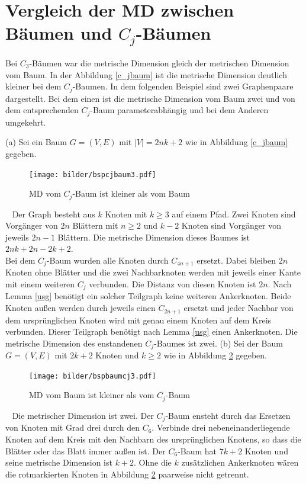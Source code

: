 \section{Vergleich der MD zwischen Bäumen und $C_j$-Bäumen}
Bei $C_3$-Bäumen war die metrische Dimension gleich der metrischen Dimension vom Baum. In der Abbildung \ref{c_jbaum} ist die metrische Dimension deutlich kleiner bei dem $C_j$-Baumen. In dem folgenden Beispiel sind zwei Graphenpaare dargestellt. Bei dem einen ist die metrische Dimension vom Baum zwei und von dem entsprechenden $C_j$-Baum parameterabhängig und bei dem Anderen umgekehrt.\\
\begin{bsp} (a) Sei ein Baum $G=(V,E)$ mit $|V|=2nk+2$ wie in Abbildung \ref{c_jbaum} gegeben.

\begin{figure}[ht]
\centering
\texttt{[image: bilder/bspcjbaum3.pdf]}
\caption{MD vom $C_j$-Baum ist kleiner als vom Baum}
\label{cjbaum}
\end{figure}
\vspace{-5mm}
~\linebreak
Der Graph besteht aus $k$ Knoten mit $k\geq 3$ auf einem Pfad. Zwei Knoten sind Vorgänger von $2n$ Blättern mit $n\geq 2$ und $k-2$ Knoten sind Vorgänger von jeweils $2n-1$ Blättern. Die metrische Dimension dieses Baumes ist $2nk+2n-2k+2$.\\
Bei dem $C_j$-Baum wurden alle Knoten durch $C_{4n+1}$ ersetzt. Dabei bleiben $2n$ Knoten ohne Blätter und die zwei Nachbarknoten werden mit jeweils einer Kante mit einem weiteren $C_j$ verbunden. Die Distanz von diesen Knoten ist $2n$. Nach Lemma \ref{usg} benötigt ein solcher Teilgraph keine weiteren Ankerknoten. Beide Knoten außen werden durch jeweils einen $C_{2n+1}$ ersetzt und jeder Nachbar von dem ursprünglichen Knoten wird mit genau einem Knoten auf dem Kreis verbunden. Dieser Teilgraph benötigt nach Lemma \ref{usg} einen Ankerknoten. Die metrische Dimension des enstandenen $C_j$-Baumes ist zwei.\newline\newline
(b) Sei der Baum $G=(V,E)$ mit $2k+2$ Knoten und $k\geq 2$ wie in Abbildung \ref{baumcj} gegeben.
\begin{figure}[ht]
\centering
\texttt{[image: bilder/bspbaumcj3.pdf]}
\caption{MD vom Baum ist kleiner als vom $C_j$-Baum}
\label{baumcj}
\end{figure}
\vspace{-3mm}
~\linebreak
Die metrischer Dimension ist zwei. Der $C_j$-Baum ensteht durch das Ersetzen von Knoten mit Grad drei durch den $C_6$. Verbinde drei nebeneinanderliegende Knoten auf dem Kreis mit den Nachbarn des ursprünglichen Knotens, so dass die Blätter oder das Blatt immer außen ist. Der $C_6$-Baum hat $7k+2$ Knoten und seine metrische Dimension ist $k+2$. Ohne die $k$ zusätzlichen Ankerknoten wären die rotmarkierten Knoten in Abbildung \ref{baumcj} paarweise nicht getrennt.
\end{bsp}
